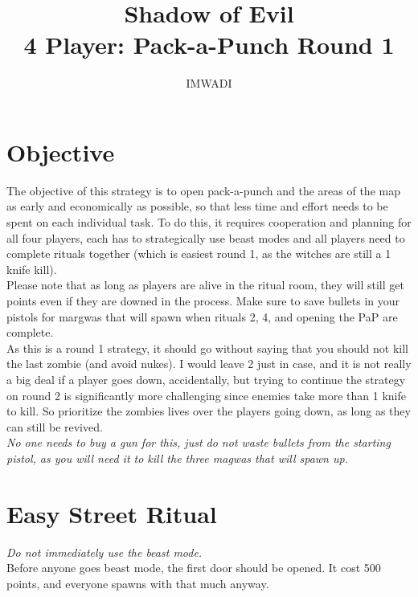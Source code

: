 \documentclass[11pt]{article} %
\title{Shadow of Evil \\ \Large 4 Player: Pack-a-Punch Round 1}
\author{IMWADI}
\begin{document}
\maketitle

\section*{Objective}

	The objective of this strategy is to open pack-a-punch and the areas of the map as early and economically as possible, so that less time and effort needs to be spent on each individual task. To do this, it requires cooperation and planning for all four players, each has to strategically use beast modes and all players need to complete rituals together (which is easiest round 1, as the witches are still a 1 knife kill). \\
	\newline
	Please note that as long as players are alive in the ritual room, they will still get points even if they are downed in the process. Make sure to save bullets in your pistols for margwas that will spawn when rituals 2, 4, and opening the PaP are complete. \\
	\newline
	As this is a round 1 strategy, it should go without saying that you should not kill the last zombie (and avoid nukes). I would leave 2 just in case, and it is not really a big deal if a player goes down, accidentally, but trying to continue the strategy on round 2 is significantly more challenging since enemies take more than 1 knife to kill. So prioritize the zombies lives over the players going down, as long as they can still be revived. \\
	\newline
	\emph{No one needs to buy a gun for this, just do not waste bullets from the starting pistol, as you will need it to kill the three magwas that will spawn up.}

\newpage
\section{Easy Street Ritual}

	\emph{Do not immediately use the beast mode.}\\
	
	Before anyone goes beast mode, the first door should be opened. It cost 500 points, and everyone spawns with that much anyway. \\
\end{document}

